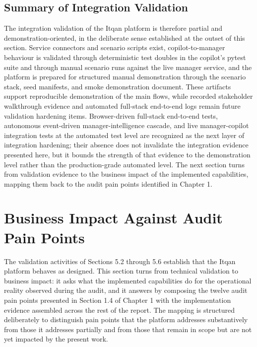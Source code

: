 \subsection{Summary of Integration Validation}
The integration validation of the Itqan platform is therefore partial and demonstration-oriented, in the deliberate sense established at the outset of this section. Service connectors and scenario scripts exist, copilot-to-manager behaviour is validated through deterministic test doubles in the copilot's pytest suite and through manual scenario runs against the live manager service, and the platform is prepared for structured manual demonstration through the scenario stack, seed manifests, and smoke demonstration document. These artifacts support reproducible demonstration of the main flows, while recorded stakeholder walkthrough evidence and automated full-stack end-to-end logs remain future validation hardening items. Browser-driven full-stack end-to-end tests, autonomous event-driven manager-intelligence cascade, and live manager-copilot integration tests at the automated test level are recognized as the next layer of integration hardening; their absence does not invalidate the integration evidence presented here, but it bounds the strength of that evidence to the demonstration level rather than the production-grade automated level. The next section turns from validation evidence to the business impact of the implemented capabilities, mapping them back to the audit pain points identified in Chapter 1.

\section{Business Impact Against Audit Pain Points}
The validation activities of Sections 5.2 through 5.6 establish that the Itqan platform behaves as designed. This section turns from technical validation to business impact: it asks what the implemented capabilities do for the operational reality observed during the audit, and it answers by composing the twelve audit pain points presented in Section 1.4 of Chapter 1 with the implementation evidence assembled across the rest of the report. The mapping is structured deliberately to distinguish pain points that the platform addresses substantively from those it addresses partially and from those that remain in scope but are not yet impacted by the present work.

